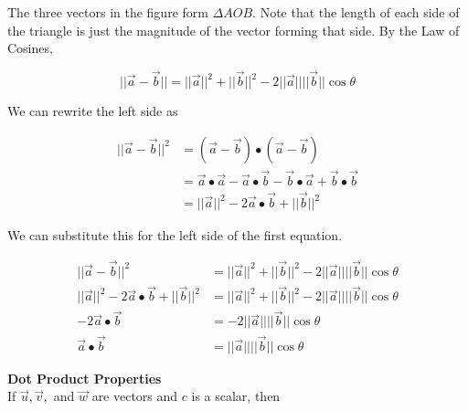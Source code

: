         \noindent The three vectors in the figure form $\Delta AOB$. Note that the length of
        each side of the triangle is just the magnitude of the vector forming that side.
        By the Law of Cosines,

        \begin{equation*}
            ||\overrightarrow{a}-\overrightarrow{b}||
            =||\overrightarrow{a}||^2+||\overrightarrow{b}||^2-2||\overrightarrow{a}||||\overrightarrow{b}
            ||\cos{\theta}
        \end{equation*}

        \pagebreak
        \noindent We can rewrite the left side as

        \begin{align*}
            ||\overrightarrow{a}-\overrightarrow{b}||^2 &
            = (\overrightarrow{a}-\overrightarrow{b})\bullet(\overrightarrow{a}-\overrightarrow{b})\\
            &= \overrightarrow{a}\bullet\overrightarrow{a}
            -\overrightarrow{a}\bullet\overrightarrow{b}-\overrightarrow{b}\bullet\overrightarrow{a}
            +\overrightarrow{b}\bullet\overrightarrow{b}\\
            &= ||\overrightarrow{a}||^2-2\overrightarrow{a}\bullet\overrightarrow{b}+||\overrightarrow{b}||^2
        \end{align*}

        \noindent We can substitute this for the left side of the first equation.

        \begin{align*}
            ||\overrightarrow{a}-\overrightarrow{b}||^2
            &= ||\overrightarrow{a}||^2+||\overrightarrow{b}||^2-2||\overrightarrow{a}
            ||||\overrightarrow{b}||\cos{\theta}\\
            ||\overrightarrow{a}||^2-2\overrightarrow{a}\bullet\overrightarrow{b}
            +||\overrightarrow{b}||^2 &= ||\overrightarrow{a}||^2+||\overrightarrow{b}||^2-2
            ||\overrightarrow{a}||||\overrightarrow{b}||\cos{\theta}\\
            -2\overrightarrow{a}\bullet\overrightarrow{b} &= -2||\overrightarrow{a}||||\overrightarrow{b}
            ||\cos{\theta}\\\overrightarrow{a}\bullet\overrightarrow{b} &= ||\overrightarrow{a}
            ||||\overrightarrow{b}||\cos{\theta}
        \end{align*}

        \noindent \color{red} \textbf{Dot Product Properties}\\ \color{black} If
        $\overrightarrow{u}, \overrightarrow{v},$ and $\overrightarrow{w}$ are vectors and
        $c$ is a scalar, then

